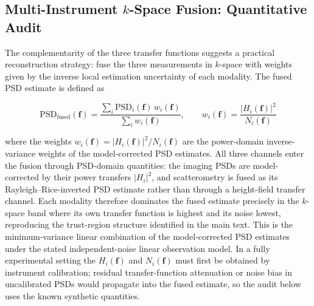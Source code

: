 \documentclass[review,12pt]{elsarticle}
\begin{document}


\subsection{Multi-Instrument $k$-Space Fusion: Quantitative Audit}

The complementarity of the three transfer functions suggests a practical reconstruction strategy: fuse the three measurements in $k$-space with weights given by the inverse local estimation uncertainty of each modality. The fused PSD estimate is defined as

\begin{equation}
    \mathrm{PSD}_\mathrm{fused}(\mathbf{f}) = \frac{\sum_i \mathrm{PSD}_i(\mathbf{f}) \, w_i(\mathbf{f})}{\sum_i w_i(\mathbf{f})}, \qquad
    w_i(\mathbf{f}) = \frac{|H_i(\mathbf{f})|^2}{N_i(\mathbf{f})}
    \label{eq:fusion}
\end{equation}

where the weights $w_i(\mathbf{f}) = |H_i(\mathbf{f})|^2/N_i(\mathbf{f})$ are the power-domain inverse-variance weights of the model-corrected PSD estimates. All three channels enter the fusion through PSD-domain quantities: the imaging PSDs are model-corrected by their power transfers $|H_i|^2$, and scatterometry is fused as its Rayleigh--Rice-inverted PSD estimate rather than through a height-field transfer channel. Each modality therefore dominates the fused estimate precisely in the $k$-space band where its own transfer function is highest and its noise lowest, reproducing the trust-region structure identified in the main text. This is the minimum-variance linear combination of the model-corrected PSD estimates under the stated independent-noise linear observation model. In a fully experimental setting the $H_i(\mathbf{f})$ and $N_i(\mathbf{f})$ must first be obtained by instrument calibration; residual transfer-function attenuation or noise bias in uncalibrated PSDs would propagate into the fused estimate, so the audit below uses the known synthetic quantities.
\end{document}
